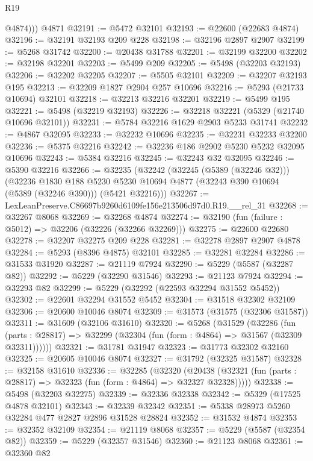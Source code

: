 \begin{lexlean}{R19}
\begin{coremodule}
          @4874)))
    @4871
@32191 := @5472 @32101
@32193 := @22600 (@22683 @4874)
@32196 := @32191 @32193 @209 @228
@32198 := @32196 @2897 @2907
@32199 := @5268 @31742
@32200 := @20438 @31788
@32201 := @32199 @32200
@32202 := @32198 @32201
@32203 := @5499 @209
@32205 := @5498 (@32203 @32193)
@32206 := @32202 @32205
@32207 := @5505 @32101
@32209 := @32207 @32193 @195
@32213 := @32209 @1827 @2904 @257 @10696
@32216 := @5293 (@21733 @10694) @32101
@32218 := @32213 @32216 @32201
@32219 := @5499 @195
@32221 := @5498 (@32219 @32193)
@32226 := @32218 @32221 (@5329 (@21740 @10696 @32101))
@32231 := @5784 @32216 @1629 @2903 @5233 @31741
@32232 := @4867 @32095
@32233 := @32232 @10696
@32235 := @32231 @32233 @32200
@32236 := @5375 @32216
@32242 := @32236 @186 @2902 @5230 @5232 @32095 @10696
@32243 := @5384 @32216
@32245 := @32243 @32 @32095
@32246 := @5390 @32216
@32266 := @32235
    (@32242
      (@32245 (@5389 (@32246 @32)))
      (@32236
        @1830
        @188
        @5230
        @5230
        @10694
        @4877
        (@32243 @390 @10694 (@5389 (@32246 @390)))
        (@5421 @32216)))
@32267 := LexLeanPreserve.C86697b9260d6109fe156e213506d97d0.R19.__rel_31
@32268 := @32267 @8068
@32269 := @32268 @4874
@32274 := @32190 (fun (failure : @5012) => @32206 (@32226 (@32266 @32269)))
@32275 := @22600 @22680
@32278 := @32207 @32275 @209 @228
@32281 := @32278 @2897 @2907 @4878
@32284 := @5293 (@8396 @4875) @32101
@32285 := @32281 @32284
@32286 := @31533 @31920
@32287 := @21119 @7924
@32290 := @5229 (@5587 (@32287 @82))
@32292 := @5229 (@32290 @31546)
@32293 := @21123 @7924
@32294 := @32293 @82
@32299 := @5229 (@32292 (@22593 @32294 @31552 @5452))
@32302 := @22601 @32294 @31552 @5452
@32304 := @31518 @32302 @32109
@32306 := @20600 @10046 @8074
@32309 := @31573 (@31575 (@32306 @31587))
@32311 := @31609 (@32106 @31610)
@32320 := @5268
    (@31529
      (@32286
        (fun (parts : @28817) => @32299 (@32304 (fun (form : @4864) => @31567 (@32309 @32311))))))
@32321 := @31781 @31947
@32323 := @31773 @32302 @32160
@32325 := @20605 @10046 @8074
@32327 := @31792 (@32325 @31587)
@32328 := @32158 @31610
@32336 := @32285
    (@32320
      (@20438 (@32321 (fun (parts : @28817) => @32323 (fun (form : @4864) => @32327 @32328)))))
@32338 := @5498 (@32203 @32275)
@32339 := @32336 @32338
@32342 := @5329 (@17525 @4878 @32101)
@32343 := @32339 @32342
@32351 := @5338 @28973 @5260 @32284 @477 @2827 @2896 @31528 @28824
@32352 := @31532 @4874
@32353 := @32352 @32109
@32354 := @21119 @8068
@32357 := @5229 (@5587 (@32354 @82))
@32359 := @5229 (@32357 @31546)
@32360 := @21123 @8068
@32361 := @32360 @82

\end{coremodule}
\end{lexlean}
